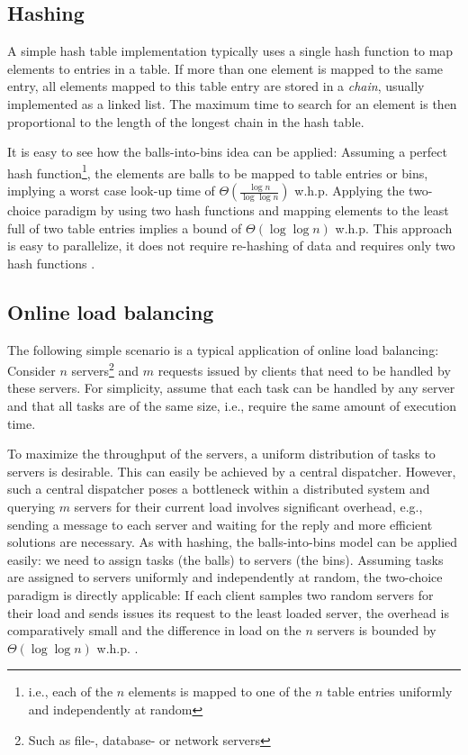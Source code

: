 \documentclass[a4paper,12pt]{article}
\begin{document}
\subsection{Hashing}
\label{sec:hashing}
A simple hash table implementation typically uses a single hash function to map elements to entries in a table. If more than one element is mapped to the same entry, all elements mapped to this table entry are stored in a \emph{chain}, usually implemented as a linked list. The maximum time to search for an element is then proportional to the length of the longest chain in the hash table. 

It is easy to see how the balls-into-bins idea can be applied: Assuming a perfect hash function\footnote{i.e., each of the $n$ elements is mapped to one of the $n$ table entries uniformly and independently at random}, the elements are balls to be mapped to table entries or bins, implying a worst case look-up time of $\Theta\left(\frac{\log n}{\log \log n}\right)$ w.h.p. Applying the two-choice paradigm by using two hash functions and mapping elements to the least full of two table entries implies a bound of $\Theta\left(\log \log n\right)$ w.h.p. This approach is easy to parallelize, it does not require re-hashing of data and requires only two hash functions \cite{ABKU99} \cite{MRS01}.

\subsection{Online load balancing}
\label{sec:loadbalancing}
The following simple scenario is a typical application of online load balancing: Consider $n$ servers\footnote{Such as file-, database- or network servers} and $m$ requests issued by clients that need to be handled by these servers. For simplicity, assume that each task can be handled by any server and that all tasks are of the same size, i.e., require the same amount of execution time.

To maximize the throughput of the servers, a uniform distribution of tasks to servers is desirable. This can easily be achieved by a central dispatcher. However, such a central dispatcher poses a bottleneck within a distributed system and querying $m$ servers for their current load involves significant overhead, e.g., sending a message to each server and waiting for the reply and more efficient solutions are necessary. As with hashing, the balls-into-bins model can be applied easily: we need to assign tasks (the balls) to servers (the bins). Assuming tasks are assigned to servers uniformly and independently at random, the two-choice paradigm is directly applicable: If each client samples two random servers for their load and sends issues its request to the least loaded server, the overhead is comparatively small and the difference in load on the $n$ servers is bounded by $\Theta\left(\log \log n\right)$ w.h.p. \cite{KLM92} \cite{RS98} \cite{MRS01}.  
\end{document}
